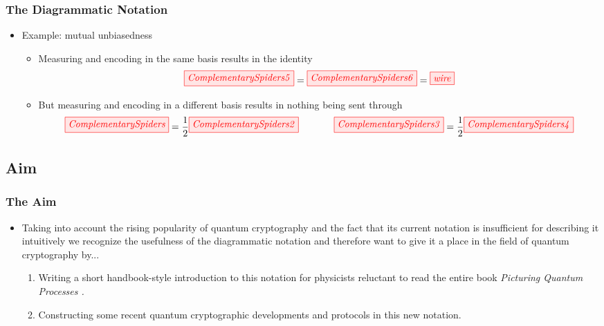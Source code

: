 \documentclass[]{beamer}
\begin{document}
\begin{frame}
	\frametitle{The Diagrammatic Notation}
	\begin{itemize}
		\item Example: mutual unbiasedness
		\begin{itemize}
			\item Measuring and encoding in the same basis results in the identity
			\begin{equation}
			\label{equation:ComplementarityPositive}
			\tikzfig{ComplementarySpiders5} = \tikzfig{ComplementarySpiders6} = \tikzfig{wire}
			\end{equation}
			\item But measuring and encoding in a different basis results in nothing being sent through
			\begin{equation}
			\label{equation:Complementarity}
			\tikzfig{ComplementarySpiders} = \frac{1}{2} \tikzfig{ComplementarySpiders2} ~~~~~~~~~~~ \tikzfig{ComplementarySpiders3} = \frac{1}{2} \tikzfig{ComplementarySpiders4} 
			\end{equation}
		\end{itemize}
	\end{itemize}

\end{frame}

\subsection{Aim}

\begin{frame}
	\frametitle{The Aim}
	\begin{itemize}
		\item Taking into account the rising popularity of quantum cryptography and the fact that its current notation is insufficient for describing it intuitively we recognize the usefulness of the diagrammatic notation and therefore want to give it a place in the field of quantum cryptography by...
		\vspace{0.6cm}
		\begin{enumerate}
			\item Writing a short handbook-style introduction to this notation for physicists reluctant to read the entire book \textit{Picturing Quantum Processes \cite{Coecke2017}.}
			\vspace{0.6cm}
			\item Constructing some recent quantum cryptographic developments and protocols in this new notation.
		\end{enumerate}
	\end{itemize}
\end{frame}
\end{document}
